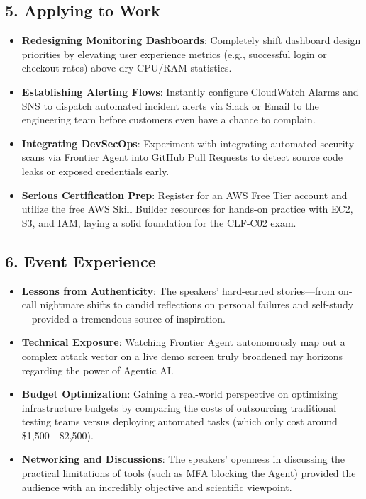 \hypertarget{applying-to-work}{%
\subsection{5. Applying to Work}}

\begin{itemize}
\tightlist
\item
  \textbf{Redesigning Monitoring Dashboards}: Completely shift dashboard
  design priorities by elevating user experience metrics (e.g.,
  successful login or checkout rates) above dry CPU/RAM statistics.
\item
  \textbf{Establishing Alerting Flows}: Instantly configure CloudWatch
  Alarms and SNS to dispatch automated incident alerts via Slack or
  Email to the engineering team before customers even have a chance to
  complain.
\item
  \textbf{Integrating DevSecOps}: Experiment with integrating automated
  security scans via Frontier Agent into GitHub Pull Requests to detect
  source code leaks or exposed credentials early.
\item
  \textbf{Serious Certification Prep}: Register for an AWS Free Tier
  account and utilize the free AWS Skill Builder resources for hands-on
  practice with EC2, S3, and IAM, laying a solid foundation for the
  CLF-C02 exam.
\end{itemize}

\hypertarget{event-experience}{%
\subsection{6. Event Experience}}

\begin{itemize}
\tightlist
\item
  \textbf{Lessons from Authenticity}: The speakers' hard-earned
  stories---from on-call nightmare shifts to candid reflections on
  personal failures and self-study---provided a tremendous source of
  inspiration.
\item
  \textbf{Technical Exposure}: Watching Frontier Agent autonomously map
  out a complex attack vector on a live demo screen truly broadened my
  horizons regarding the power of Agentic AI.
\item
  \textbf{Budget Optimization}: Gaining a real-world perspective on
  optimizing infrastructure budgets by comparing the costs of
  outsourcing traditional testing teams versus deploying automated tasks
  (which only cost around \$1,500 - \$2,500).
\item
  \textbf{Networking and Discussions}: The speakers' openness in
  discussing the practical limitations of tools (such as MFA blocking
  the Agent) provided the audience with an incredibly objective and
  scientific viewpoint.
\end{itemize}

